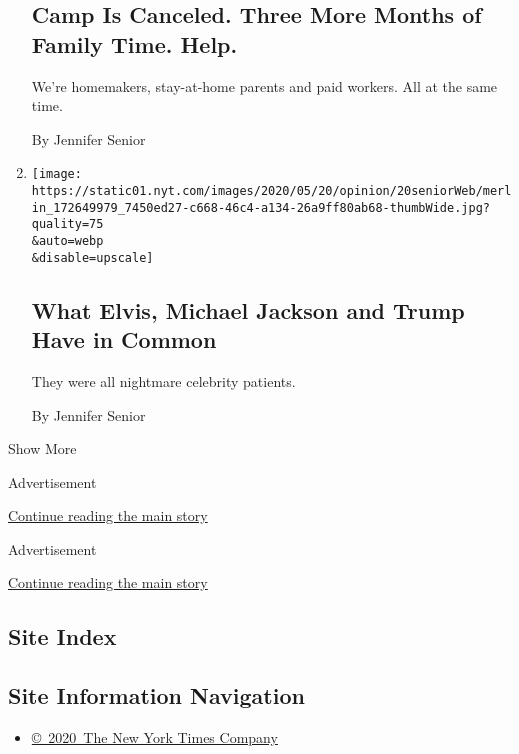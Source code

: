\begin{enumerate}
{  \subsection{Camp Is Canceled. Three More Months of Family Time.
  Help.}\label{camp-is-canceled-three-more-months-of-family-time-help}}

  We're homemakers, stay-at-home parents and paid workers. All at the
  same time.

  By Jennifer Senior
\item
  \href{/2020/05/20/opinion/trump-hydroxychloroquine-vaccine.html}{}

  \texttt{[image: https://static01.nyt.com/images/2020/05/20/opinion/20seniorWeb/merlin\_172649979\_7450ed27-c668-46c4-a134-26a9ff80ab68-thumbWide.jpg?quality=75\\\&auto=webp\\\&disable=upscale]}

  \hypertarget{what-elvis-michael-jackson-and-trump-have-in-common}{%
  \subsection{What Elvis, Michael Jackson and Trump Have in
  Common}\label{what-elvis-michael-jackson-and-trump-have-in-common}}

  They were all nightmare celebrity patients.

  By Jennifer Senior
\end{enumerate}

Show More

Advertisement

\protect\hyperlink{after-mid1}{Continue reading the main story}

Advertisement

\protect\hyperlink{after-mktg}{Continue reading the main story}

\hypertarget{site-index}{%
\subsection{Site Index}\label{site-index}}

\hypertarget{site-information-navigation}{%
\subsection{Site Information
Navigation}\label{site-information-navigation}}

\begin{itemize}
\tightlist
\item
  \href{https://help.nytimes.com/hc/en-us/articles/115014792127-Copyright-notice}{©~2020~The
  New York Times Company}
\end{itemize}

